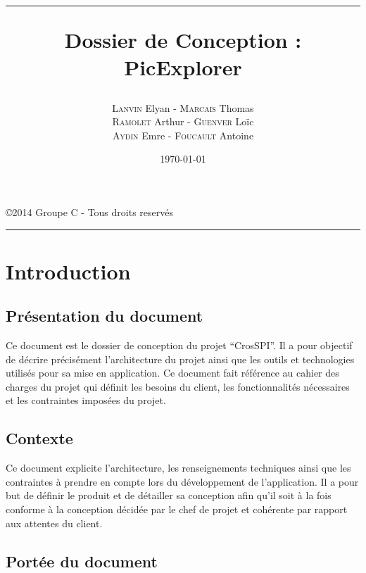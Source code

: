 \documentclass[a4paper, 12pt, twoside]{article}
\title{\hrule \vspace{1cm} Dossier de Conception : PicExplorer}
\author{\textsc{Lanvin} Elyan - \textsc{Marcais} Thomas\\ \textsc{Ramolet} Arthur - \textsc{Guenver} Loïc\\ \textsc{Aydin} Emre - \textsc{Foucault} Antoine}
\date{\today}
\begin{document}
\pagestyle{fancy}
\lhead{}
\chead{}
\rhead{\leftmark}
\cfoot{}

\clearpage
\thispagestyle{empty}

\maketitle
\begin{center}
 \copyright 2014 Groupe C - Tous droits reservés\\
\end{center}
\vspace{1cm}
\hrule
\thispagestyle{empty}

\newpage

\renewcommand{\contentsname}{Sommaire}
\tableofcontents
\newpage

\section{Introduction}

\subsection{Présentation du document}

Ce document est le dossier de conception du projet “CrosSPI”. Il a pour objectif de décrire précisément l’architecture du projet ainsi que les outils et technologies utilisés pour sa mise en application.
\smallbreak
Ce document fait référence au cahier des charges du projet qui définit les besoins du client, les fonctionnalités nécessaires et les contraintes imposées du projet.

\subsection{Contexte}

Ce document explicite l’architecture, les renseignements techniques ainsi que les contraintes à prendre en compte lors du développement de l’application.
\smallbreak
Il a pour but de définir le produit et de détailler sa conception afin qu’il soit à la fois conforme à la conception décidée par le chef de projet et cohérente par rapport aux attentes du client.

\subsection{Portée du document}
\end{document}
